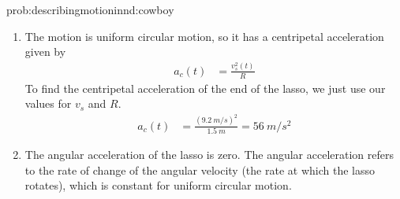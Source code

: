 \begin{solution}{prob:describingmotioninnd:cowboy}
\begin{enumerate}[label=\alph*)]
\item The motion is uniform circular motion, so it has a centripetal acceleration given by
\begin{align*}
a_c(t)&=\frac{v_s^2(t)}{R}
\end{align*}
To find the centripetal acceleration of the end of the lasso, we just use our values for $v_s$ and $R$.
\begin{align*}
a_c(t)&=\frac{(\SI{9.2}{m/s})^2}{\SI{1.5}{m}}=\SI{56}{m/s^2}
\end{align*}
 
\item The angular acceleration of the lasso is zero. The angular acceleration refers to the rate of change of the angular velocity (the rate at which the lasso rotates), which is constant for uniform circular motion.
\end{enumerate}
\end{solution}